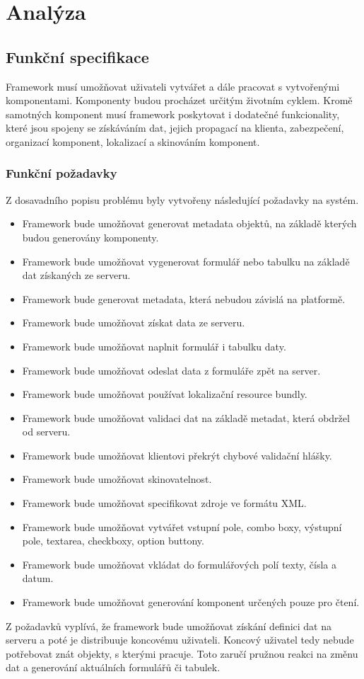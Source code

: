 \chapter{Analýza}
\section{Funkční specifikace}
Framework \cite{framework} musí umožňovat uživateli vytvářet a dále pracovat s vytvořenými komponentami. Komponenty budou procházet určitým životním cyklem. Kromě samotných komponent musí framework poskytovat i dodatečné funkcionality, které jsou spojeny se získáváním dat, jejich propagací na klienta, zabezpečení, organizací komponent, lokalizací a skinováním komponent.
\subsection{Funkční požadavky}
Z dosavadního popisu problému byly vytvořeny následující požadavky na systém.
\begin{itemize}
\item Framework bude umožňovat generovat metadata objektů, na základě kterých budou generovány komponenty.
\item Framework bude umožňovat vygenerovat formulář nebo tabulku na základě dat získaných ze serveru.
\item Framework bude generovat metadata, která nebudou závislá na platformě.
\item Framework bude umožňovat získat data ze serveru.
\item Framework bude umožňovat naplnit formulář i tabulku daty.
\item Framework bude umožňovat odeslat data z formuláře zpět na server.
\item Framework bude umožňovat používat lokalizační resource bundly.
\item Framework bude umožňovat validaci dat na základě metadat, která obdržel od serveru.
\item Framework bude umožňovat klientovi překrýt chybové validační hlášky.
\item Framework bude umožňovat skinovatelnost.
\item Framework bude umožňovat specifikovat zdroje ve formátu XML.
\item Framework bude umožňovat vytvářet vstupní pole, combo boxy, výstupní pole, textarea, checkboxy, option buttony.
\item Framework bude umožňovat vkládat do formulářových polí texty, čísla a datum.
\item Framework bude umožňovat generování komponent určených pouze pro čtení. 
\end{itemize} 
Z požadavků vyplívá, že framework bude umožňovat získání definici dat na serveru a poté je distribuuje koncovému uživateli. Koncový uživatel tedy nebude potřebovat znát objekty, s kterými pracuje. Toto zaručí pružnou reakci na změnu dat a generování aktuálních formulářů či tabulek. 
